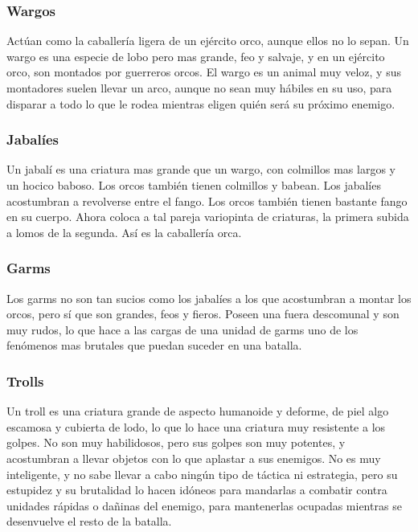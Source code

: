 
\subsubsection*{Wargos}
Actúan como la caballería ligera de un ejército orco, aunque ellos no lo
sepan. Un wargo es una especie de lobo pero mas grande, feo y
salvaje, y en un ejército orco, son montados por guerreros orcos. El
wargo es un animal muy veloz, y sus montadores suelen llevar un arco,
aunque no sean muy hábiles en su uso, para disparar a todo lo que le
rodea mientras eligen quién será su próximo enemigo.


\subsubsection*{Jabalíes}
Un jabalí es una criatura mas grande que un wargo, con colmillos mas
largos y un hocico baboso. Los orcos también tienen colmillos y
babean. Los jabalíes acostumbran a revolverse entre el fango. Los
orcos también tienen bastante fango en su cuerpo. Ahora coloca a tal
pareja variopinta de criaturas, la primera subida a lomos de la
segunda. Así es la caballería orca.


\subsubsection*{Garms}
Los garms no son tan sucios como los jabalíes a los que acostumbran a
montar los orcos, pero sí que son grandes, feos y fieros. Poseen una
fuera descomunal y son muy rudos, lo que hace a las cargas de una
unidad de garms uno de los fenómenos mas brutales que puedan suceder
en una batalla.


\subsubsection*{Trolls}
Un troll es una criatura grande de aspecto humanoide y deforme, de
piel algo escamosa y cubierta de lodo, lo que lo hace una criatura muy
resistente a los golpes. No son muy habilidosos, pero sus golpes son
muy potentes, y acostumbran a llevar objetos con lo que aplastar a sus
enemigos. No es muy inteligente, y no sabe llevar a cabo ningún tipo
de táctica ni estrategia, pero su estupidez y su brutalidad lo hacen
idóneos para mandarlas a combatir contra unidades rápidas o dañinas
del enemigo, para mantenerlas ocupadas mientras se desenvuelve el
resto de la batalla.

